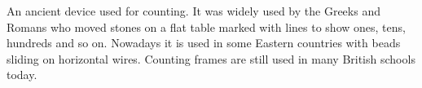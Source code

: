An ancient device used for counting. 
It was widely used by the Greeks and Romans who moved stones on a flat table marked with lines to show ones, tens, hundreds and so on.
Nowadays it is used in some Eastern countries with beads sliding on horizontal wires. Counting frames are still used in many British schools today.